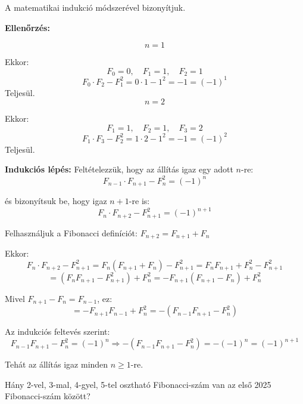 \begin{solution}
A matematikai indukció módszerével bizonyítjuk.

\textbf{Ellenőrzés:}

\[
n=1
\]

Ekkor: 
\[
F_{0}=0,\quad F_{1}=1,\quad F_{2}=1
\]
\[
F_{0}\cdot F_{2}-F_{1}^{2}=0\cdot1-1^{2}=-1=(-1)^{1}
\]
Teljesül. 
\[
n=2
\]

Ekkor: 
\[
F_{1}=1,\quad F_{2}=1,\quad F_{3}=2
\]
\[
F_{1}\cdot F_{3}-F_{2}^{2}=1\cdot2-1^{2}=-1=(-1)^{2}
\]
Teljesül.

\textbf{Indukciós lépés:} Feltételezzük, hogy az állítás igaz egy
adott $n$-re: 
\[
F_{n-1}\cdot F_{n+1}-F_{n}^{2}=(-1)^{n}
\]

és bizonyítsuk be, hogy igaz $n+1$-re is: 
\[
F_{n}\cdot F_{n+2}-F_{n+1}^{2}=(-1)^{n+1}
\]

Felhasználjuk a Fibonacci definíciót: $F_{n+2}=F_{n+1}+F_{n}$

Ekkor: 
\[
F_{n}\cdot F_{n+2}-F_{n+1}^{2}=F_{n}(F_{n+1}+F_{n})-F_{n+1}^{2}=F_{n}F_{n+1}+F_{n}^{2}-F_{n+1}^{2}
\]
\[
=(F_{n}F_{n+1}-F_{n+1}^{2})+F_{n}^{2}=-F_{n+1}(F_{n+1}-F_{n})+F_{n}^{2}
\]

Mivel $F_{n+1}-F_{n}=F_{n-1}$, ez: 
\[
=-F_{n+1}F_{n-1}+F_{n}^{2}=-(F_{n-1}F_{n+1}-F_{n}^{2})
\]

Az indukciós feltevés szerint: 
\[
F_{n-1}F_{n+1}-F_{n}^{2}=(-1)^{n}\Rightarrow-(F_{n-1}F_{n+1}-F_{n}^{2})=-(-1)^{n}=(-1)^{n+1}
\]

Tehát az állítás igaz minden $n\geq1$-re. 
\end{solution}
\begin{extraproblem}
Hány 2-vel, 3-mal, 4-gyel, 5-tel osztható Fibonacci-szám van az első
2025 Fibonacci-szám között? 
\end{extraproblem}

